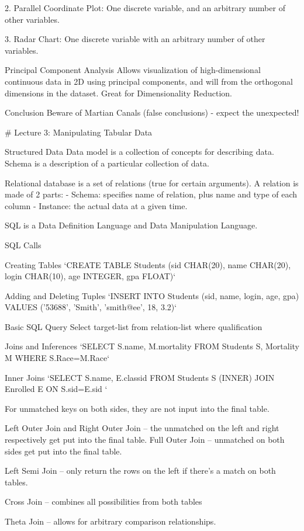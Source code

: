 \documentclass[3pt,landscape]{article}
\begin{document}
\begin{multicols}{3}
2. Parallel Coordinate Plot: One discrete variable, and an arbitrary number of other variables.

3. Radar Chart: One discrete variable with an arbitrary number of other variables.

Principal Component Analysis
Allows visualization of high-dimensional continuous data in 2D using principal components, and will from the orthogonal dimensions in the dataset. Great for Dimensionality Reduction.

Conclusion
Beware of Martian Canals (false conclusions) - expect the unexpected!

\# Lecture 3: Manipulating Tabular Data

Structured Data
Data model is a collection of concepts for describing data.
Schema is a description of a particular collection of data.

Relational database is a set of relations (true for certain arguments).
A relation is made of 2 parts:
- Schema: specifies name of relation, plus name and type of each column
- Instance: the actual data at a given time. 

SQL is a Data Definition Language and Data Manipulation Language. 

SQL Calls

Creating Tables
`CREATE TABLE Students (sid CHAR(20), name CHAR(20), login CHAR(10), age INTEGER, gpa FLOAT)`

Adding and Deleting Tuples
`INSERT INTO Students (sid, name, login, age, gpa) VALUES ('53688', 'Smith', 'smith@ee', 18, 3.2)`

Basic SQL Query
Select target-list from relation-list where qualification

Joins and Inferences
`SELECT S.name, M.mortality FROM Students S, Mortality M WHERE S.Race=M.Race`

Inner Joins
`SELECT S.name, E.classid FROM Students S (INNER) JOIN Enrolled E ON S.sid=E.sid `

For unmatched keys on both sides, they are not input into the final table.

Left Outer Join and Right Outer Join – the unmatched on the left and right respectively get put into the final table. Full Outer Join – unmatched on both sides get put into the final table.

Left Semi Join – only return the rows on the left if there’s a match on both tables.

Cross Join – combines all possibilities from both tables

Theta Join – allows for arbitrary comparison relationships.


\end{multicols}
\end{document}
